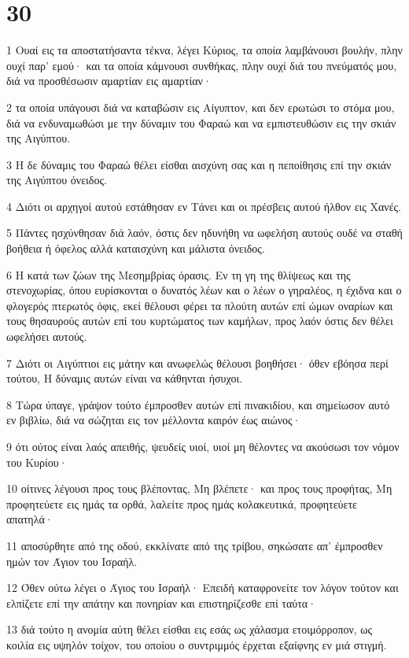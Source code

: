 \chapter{30}

\par 1 Ουαί εις τα αποστατήσαντα τέκνα, λέγει Κύριος, τα οποία λαμβάνουσι βουλήν, πλην ουχί παρ' εμού· και τα οποία κάμνουσι συνθήκας, πλην ουχί διά του πνεύματός μου, διά να προσθέσωσιν αμαρτίαν εις αμαρτίαν·
\par 2 τα οποία υπάγουσι διά να καταβώσιν εις Αίγυπτον, και δεν ερωτώσι το στόμα μου, διά να ενδυναμωθώσι με την δύναμιν του Φαραώ και να εμπιστευθώσιν εις την σκιάν της Αιγύπτου.
\par 3 Η δε δύναμις του Φαραώ θέλει είσθαι αισχύνη σας και η πεποίθησις επί την σκιάν της Αιγύπτου όνειδος.
\par 4 Διότι οι αρχηγοί αυτού εστάθησαν εν Τάνει και οι πρέσβεις αυτού ήλθον εις Χανές.
\par 5 Πάντες ησχύνθησαν διά λαόν, όστις δεν ηδυνήθη να ωφελήση αυτούς ουδέ να σταθή βοήθεια ή όφελος αλλά καταισχύνη και μάλιστα όνειδος.
\par 6 Η κατά των ζώων της Μεσημβρίας όρασις. Εν τη γη της θλίψεως και της στενοχωρίας, όπου ευρίσκονται ο δυνατός λέων και ο λέων ο γηραλέος, η έχιδνα και ο φλογερός πτερωτός όφις, εκεί θέλουσι φέρει τα πλούτη αυτών επί ώμων οναρίων και τους θησαυρούς αυτών επί του κυρτώματος των καμήλων, προς λαόν όστις δεν θέλει ωφελήσει αυτούς.
\par 7 Διότι οι Αιγύπτιοι εις μάτην και ανωφελώς θέλουσι βοηθήσει· όθεν εβόησα περί τούτου, Η δύναμις αυτών είναι να κάθηνται ήσυχοι.
\par 8 Τώρα ύπαγε, γράψον τούτο έμπροσθεν αυτών επί πινακιδίου, και σημείωσον αυτό εν βιβλίω, διά να σώζηται εις τον μέλλοντα καιρόν έως αιώνος·
\par 9 ότι ούτος είναι λαός απειθής, ψευδείς υιοί, υιοί μη θέλοντες να ακούσωσι τον νόμον του Κυρίου·
\par 10 οίτινες λέγουσι προς τους βλέποντας, Μη βλέπετε· και προς τους προφήτας, Μη προφητεύετε εις ημάς τα ορθά, λαλείτε προς ημάς κολακευτικά, προφητεύετε απατηλά·
\par 11 αποσύρθητε από της οδού, εκκλίνατε από της τρίβου, σηκώσατε απ' έμπροσθεν ημών τον Άγιον του Ισραήλ.
\par 12 Όθεν ούτω λέγει ο Άγιος του Ισραήλ· Επειδή καταφρονείτε τον λόγον τούτον και ελπίζετε επί την απάτην και πονηρίαν και επιστηρίζεσθε επί ταύτα·
\par 13 διά τούτο η ανομία αύτη θέλει είσθαι εις εσάς ως χάλασμα ετοιμόρροπον, ως κοιλία εις υψηλόν τοίχον, του οποίου ο συντριμμός έρχεται εξαίφνης εν μιά στιγμή.

